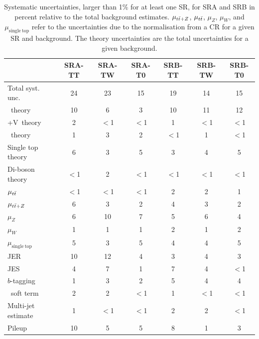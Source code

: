 			\begin{table}[htpb]
				\caption{Systematic uncertainties, larger than 1\% for at
			    least one \ac{SR}, for SRA and SRB in percent relative to the total
			    background estimates. $\mu_{t\bar{t}+Z}$, $\mu_{t\bar{t}}$, $\mu_{Z}$, $\mu_{W}$,
			    and $\mu_{\mathrm{single~top}}$ refer to the uncertainties due to the normalisation
			    from a \ac{CR} for a given \ac{SR} and background. The theory uncertainties are the
			    total uncertainties for a given background.}%
			    \label{tab:systSRAB}
				\begin{center}
				\renewcommand{\arraystretch}{1.2}
					\begin{tabular}{lcccccc}
						\toprule
						& {\textbf{SRA-TT}} & {\textbf{SRA-TW}} & {\textbf{SRA-T0}} & {\textbf{SRB-TT}} & {\textbf{SRB-TW}} & {\textbf{SRB-T0}}\\ \midrule
						{Total syst. unc.} & 24 & 23 & 15 & 19 & 14 & 15\\ \midrule
						{\ttbar\ theory} & 10 & 6 & 3 & 10 & 11 & 12\\  
						{\ttbar+V\ theory} & 2 & {$<$1\phantom{15}} & {$<$1\phantom{15}} & 1 & {$<$1\phantom{15}} & {$<$1\phantom{15}}\\  
						{\Zboson\ theory} & 1 & 3 & 2 & {$<$1\phantom{15}} & 1 & {$<$1\phantom{15}}\\  
						{Single top theory} & 6 & 3 & 5 & 3 & 4 & 5\\  
						{Di-boson theory} & {$<$1\phantom{15}} & 2 & {$<$1\phantom{15}} & {$<$1\phantom{15}} & {$<$1\phantom{15}} & {$<$1\phantom{15}}\\  
						{$\mu_{t\bar{t}}$} & {$<$1\phantom{15}} & {$<$1\phantom{15}} & {$<$1\phantom{15}} & 2 & 2 & 1\\  
						{$\mu_{t\bar{t}+Z}$} & 6 & 3 & 2 & 4 & 3 & 2\\  
						{$\mu_{Z}$} & 6 & 10 & 7 & 5 & 6 & 4\\  
						{$\mu_{W}$} & 1 & 1 & 1 & 2 & 1 & 2\\  
						{$\mu_{\mathrm{single~top}}$} & 5 & 3 & 5 & 4 & 4 & 5\\  
						{JER} & 10 & 12 & 4 & 3 & 4 & 3\\  
						{JES} & 4 & 7 & 1 & 7 & 4 & {$<$1\phantom{15}}\\  
						{$b$-tagging} & 1 & 3 & 2 & 5 & 4 & 4\\  
						{\met\ soft term} & 2 & 2 & {$<$1\phantom{15}} & 1 & {$<$1\phantom{15}} & {$<$1\phantom{15}}\\  
						{Multi-jet estimate} & 1 & {$<$1\phantom{15}} & {$<$1\phantom{15}} & 2 & 2 & {$<$1\phantom{15}}\\  
						{Pileup} & 10 & 5 & 5 & 8 & 1 & 3\\  
						\bottomrule
					\end{tabular}
				\end{center}
			\end{table}

